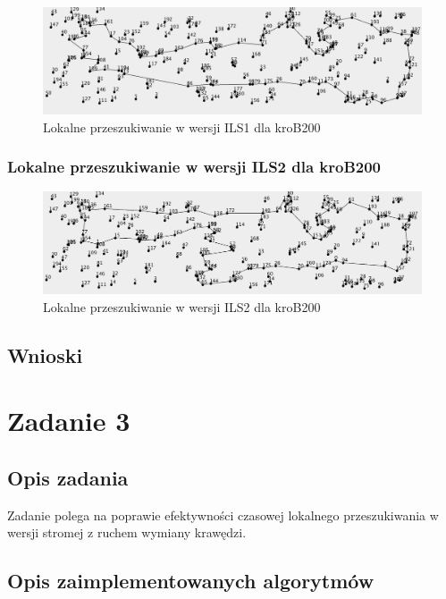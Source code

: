 \documentclass[a4paper]{article}
\begin{document}
\begin{figure}[H]
\centering
\includegraphics[width=\textwidth]{lab4/kroB_ILS1.png}
\caption{Lokalne przeszukiwanie w wersji ILS1 dla kroB200}
\end{figure}

\subsubsection{Lokalne przeszukiwanie w wersji ILS2 dla kroB200}

\begin{figure}[H]
\centering
\includegraphics[width=\textwidth]{lab4/kroB_ILS2.png}
\caption{Lokalne przeszukiwanie w wersji ILS2 dla kroB200}
\end{figure}

\subsection{Wnioski}

\section{Zadanie 3}

\subsection{Opis zadania}

Zadanie polega na poprawie efektywności czasowej lokalnego przeszukiwania w wersji stromej z ruchem wymiany krawędzi.

\subsection{Opis zaimplementowanych algorytmów}
\end{document}
